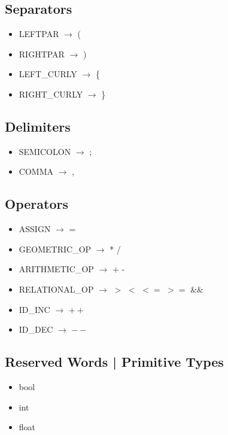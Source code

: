 \documentclass{article}
\begin{document}
\subsection{Separators}

\begin{itemize}
\item LEFTPAR $\rightarrow$ (
\item RIGHTPAR $\rightarrow$ )
\item LEFT\_CURLY $\rightarrow$ \{
\item RIGHT\_CURLY $\rightarrow$ \}
\end{itemize}

\subsection{Delimiters}

\begin{itemize}
\item SEMICOLON $\rightarrow$ ;
\item COMMA $\rightarrow$ ,
\end{itemize}

\subsection{Operators}

\begin{itemize}

\item ASSIGN $\rightarrow$ =
\item GEOMETRIC\_OP $\rightarrow$ *  /
\item ARITHMETIC\_OP $\rightarrow$ +  -
\item RELATIONAL\_OP $\rightarrow$ $>$  $<$ $<=$ $>=$ \&\& \text{\textbar\textbar}
\item ID\_INC $\rightarrow$ $++$
\item ID\_DEC $\rightarrow$ $--$
\end{itemize}

\subsection{Reserved Words | Primitive Types}

\begin{itemize}
\item bool
\item int
\item float
\end{itemize}
\end{document}
